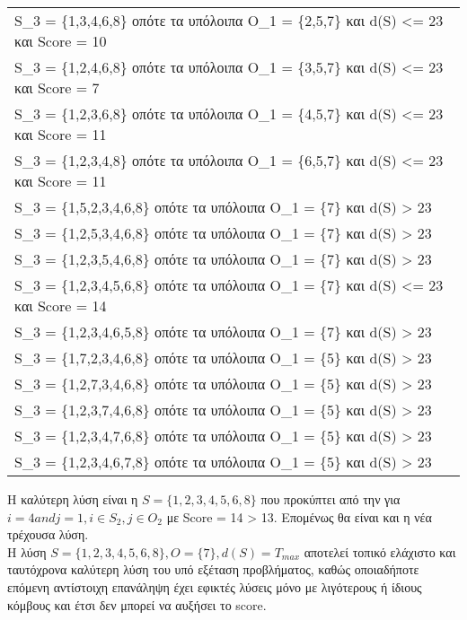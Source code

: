 \documentclass[12pt, a4paper]{article}
\begin{document}
\begin{table}[H]
\centering
\label{my-label}
\begin{tabular}{l}
S\_3 = \{1,3,4,6,8\} οπότε τα υπόλοιπα Ο\_1 = \{2,5,7\} και d(S) <= 23 και Score =  10\\
S\_3 = \{1,2,4,6,8\} οπότε τα υπόλοιπα Ο\_1 = \{3,5,7\} και d(S) <= 23 και Score =  7\\
S\_3 = \{1,2,3,6,8\} οπότε τα υπόλοιπα Ο\_1 = \{4,5,7\} και d(S) <= 23 και Score =  11\\
S\_3 = \{1,2,3,4,8\} οπότε τα υπόλοιπα Ο\_1 = \{6,5,7\} και d(S) <= 23 και Score =  11\\
S\_3 = \{1,5,2,3,4,6,8\} οπότε τα υπόλοιπα Ο\_1 = \{7\} και d(S) > 23  \\
S\_3 = \{1,2,5,3,4,6,8\} οπότε τα υπόλοιπα Ο\_1 = \{7\} και d(S) > 23  \\
S\_3 = \{1,2,3,5,4,6,8\} οπότε τα υπόλοιπα Ο\_1 = \{7\} και d(S) > 23  \\
S\_3 = \{1,2,3,4,5,6,8\} οπότε τα υπόλοιπα Ο\_1 = \{7\} και d(S) <= 23 και Score =  14\\
S\_3 = \{1,2,3,4,6,5,8\} οπότε τα υπόλοιπα Ο\_1 = \{7\} και d(S) > 23  \\
S\_3 = \{1,7,2,3,4,6,8\} οπότε τα υπόλοιπα Ο\_1 = \{5\} και d(S) > 23  \\
S\_3 = \{1,2,7,3,4,6,8\} οπότε τα υπόλοιπα Ο\_1 = \{5\} και d(S) > 23  \\
S\_3 = \{1,2,3,7,4,6,8\} οπότε τα υπόλοιπα Ο\_1 = \{5\} και d(S) > 23  \\
S\_3 = \{1,2,3,4,7,6,8\} οπότε τα υπόλοιπα Ο\_1 = \{5\} και d(S) > 23  \\
S\_3 = \{1,2,3,4,6,7,8\} οπότε τα υπόλοιπα Ο\_1 = \{5\} και d(S) > 23  \\
\end{tabular}
\end{table}

Η καλύτερη λύση είναι η \(S = \{1,2,3,4,5,6,8\}\)  που προκύπτει από την για \(i = 4 and j = 1, i \in S_2,  j \in O_2\) με Score = 14 > 13.	Επομένως θα είναι και η νέα τρέχουσα λύση. \\

H λύση \(S = \{1,2,3,4,5,6,8\},  O = \{7\}, d(S) = T_{max} \) αποτελεί τοπικό ελάχιστο και ταυτόχρονα καλύτερη λύση του υπό εξέταση προβλήματος, καθώς οποιαδήποτε επόμενη αντίστοιχη επανάληψη έχει εφικτές λύσεις μόνο με λιγότερους ή ίδιους κόμβους και έτσι δεν μπορεί να αυξήσει το score.		


\end{document}
